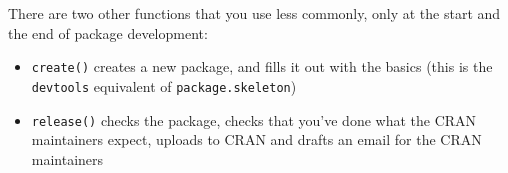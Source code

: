 There are two other functions that you use less commonly, only at the
start and the end of package development:

\begin{itemize}
\item
  \texttt{create()} creates a new package, and fills it out with the
  basics (this is the \texttt{devtools} equivalent of
  \texttt{package.skeleton})
\item
  \texttt{release()} checks the package, checks that you've done what
  the CRAN maintainers expect, uploads to CRAN and drafts an email for
  the CRAN maintainers
\end{itemize}
